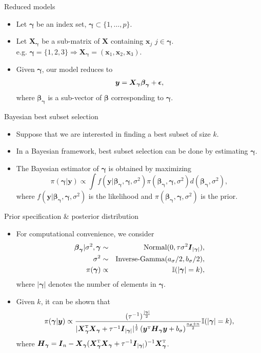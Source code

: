 \documentclass[citecolor=blue,10pt]{beamer}
\def\bg{{\boldsymbol \gamma}}
\def\T{{ \mathrm{\scriptscriptstyle T} }}
\newcommand{\0} {\mbox{\boldmath$0$}}
\newcommand{\uH} {{\boldsymbol H}}
\newcommand{\uy}{{\boldsymbol y}}
\newcommand{\ux}{{\boldsymbol x}}
\newcommand{\uX}{{\boldsymbol X}}
\newcommand{\uI} {\mbox{\boldmath$I$}}
\newcommand{\ubeta}{{\boldsymbol \beta}}
\newcommand{\uepsilon} {\mbox{\boldmath $\epsilon$}}
\begin{document}
\begin{frame}{Reduced models}
\begin{itemize}\itemsep=5mm
\item Let $\bg$ be an index set, $\bg \subset \{1,\ldots,p\}$.
\item Let $\uX_{\bg}$ be a sub-matrix of $\uX$ containing $\ux_j$ $j\in \bg$.\\
e.g. $\bg=\{1,2,3\} \Rightarrow \uX_{\bg}=(\ux_1,\ux_2,\ux_3)$.
\item Given $\bg$, our model reduces to
\begin{eqnarray*}
 \uy = \uX_{\bg} \ubeta_{\bg} + \uepsilon,
\end{eqnarray*}
where $\ubeta_{\bg}$ is a sub-vector of $\ubeta$ corresponding to $\bg$. 
\end{itemize}
\end{frame}

\begin{frame}{Bayesian best subset selection}
\begin{itemize}\itemsep=3mm
\item Suppose that we are interested in finding a best subset of size $k$.
\item In a Bayesian framework, best subset selection can be done by estimating $\bg$.
\item The Bayesian estimator of $\bg $ is obtained by maximizing
$$\pi(\bg | \uy) \propto \int f(\uy |\ubeta_\bg ,\bg,\sigma^2)\pi(\ubeta_\bg ,\bg,\sigma^2) d (\ubeta_\bg, \sigma^2) , $$
 where $f(\uy |\ubeta_\bg ,\bg,\sigma^2)$ is the likelihood and $\pi(\ubeta_\bg ,\bg,\sigma^2)$ is the prior.
\end{itemize}
\end{frame}

\begin{frame}{Prior specification \& posterior distribution}
\begin{itemize}\itemsep=3mm
\item For computational convenience, we consider
\begin{eqnarray*}
 \ubeta_{\bg}|\sigma^2,\bg &\sim&\text{Normal}(0,\tau \sigma^2 \uI_{|\bg|} ),\\
 \sigma^2 &\sim& \text{Inverse-Gamma}(a_{\sigma}/2,b_{\sigma}/2),\\
 \pi(\bg)&\propto&\mathbb{I}(|\bg|=k ),
\end{eqnarray*}
where $|\bg|$ denotes the number of elements in $\bg$.
\item Given $k$, it can be shown that 
$$\pi(\bg|\uy)\propto  \frac{(\tau^{-1})^{\frac{|\bg|}{2}}}{|\uX_{\bg}^{\T}
 \uX_{\bg}+\tau^{-1}\uI_{|\bg|} |^{\frac{1}{2}}  \left(\uy^{\T}\uH_{\bg}
 \uy+b_{\sigma}\right)^{\frac{a_{\sigma}+n}{2}  } } \mathbb{I}(|\bg|=k ),$$
 where $\uH_{\bg} = \uI_n-\uX_{\bg}(\uX_{\bg}^{\T}\uX_{\bg}+\tau^{-1}\uI_{|\bg|})^{-1}\uX_{\bg}^{\T}$.
\end{itemize}
\end{frame}
\end{document}
